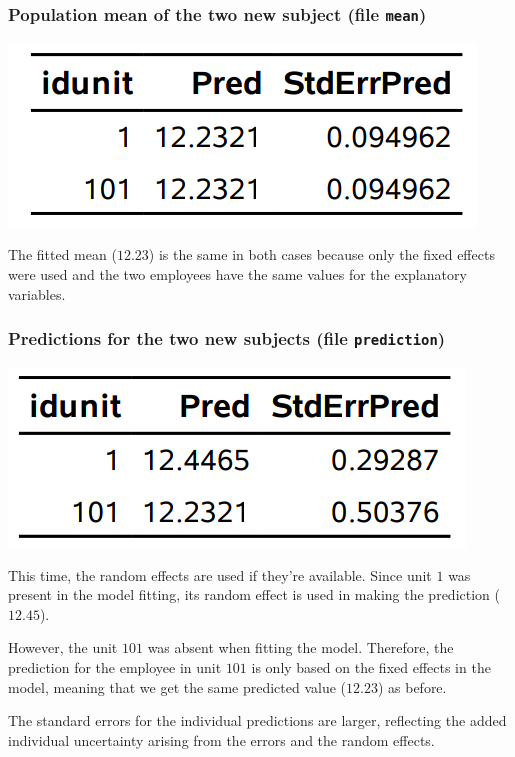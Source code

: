 \documentclass{beamer}
\begin{document}
\begin{frame}[fragile]
\frametitle{Population mean of the two new subject (file \texttt{mean})}
\begin{center}
\includegraphics[width = 0.4\linewidth]{img/c6/slides7-e21}
\end{center}
\bi
\item The fitted mean ($12.23$) is the same in both cases because only the fixed effects were used and the two employees have the same values for the explanatory variables.
\ei
\end{frame}

\begin{frame}[fragile]
\frametitle{Predictions for the two new subjects (file \texttt{prediction})}

\begin{center}
\includegraphics[width = 0.4\linewidth]{img/c6/slides7-e22}
\end{center}
\bi
\item This time, the random effects are used if they're available. Since unit $1$ was present in the model fitting, its random effect is used in making the prediction ($12.45$). 
\item However, the unit
$101$ was absent when fitting the model. Therefore, the prediction for the employee in unit $101$ is only based on the fixed effects in the model, 
meaning that we get the same predicted value ($12.23$) as before.
\item The standard errors for the individual predictions are larger, reflecting the added individual uncertainty arising from the errors and the random effects.
\ei
\end{frame}
\end{document}
